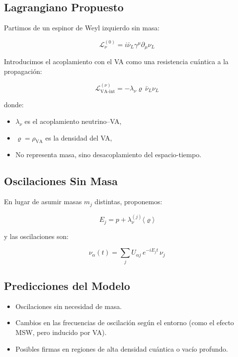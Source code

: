 \documentclass[twoside]{article}
\theoremstyle{definition}
\theoremstyle{remark}
\numberwithin{equation}{section}
\theoremstyle{definition}
\theoremstyle{example}
\theoremstyle{remark}
\numberwithin{equation}{section}%
\begin{document}
		\subsection{Lagrangiano Propuesto}
		
		Partimos de un espinor de Weyl izquierdo sin masa:
		
		\begin{equation}
			\mathcal{L}_{\nu}^{(0)} = i \bar{\nu}_L \gamma^\mu \partial_\mu \nu_L
		\end{equation}
		
		Introducimos el acoplamiento con el VA como una resistencia cuántica a la propagación:
		
		\begin{equation}
			\mathcal{L}_{\text{VA-int}}^{(\nu)} = - \lambda_{\nu} \varrho \, \bar{\nu}_L \nu_L
		\end{equation}
		
		donde:
		\begin{itemize}
			\item \(\lambda_\nu\) es el acoplamiento neutrino–VA,
			\item \(\varrho = \rho_{\text{VA}}\) es la densidad del VA,
			\item No representa masa, sino desacoplamiento del espacio-tiempo.
		\end{itemize}
		
		\subsection{Oscilaciones Sin Masa}
		
		En lugar de asumir masas \(m_j\) distintas, proponemos:
		
		\begin{equation}
			E_j = p + \lambda_\nu^{(j)} \langle \varrho \rangle
		\end{equation}
		
		y las oscilaciones son:
		
		\begin{equation}
			\nu_\alpha(t) = \sum_j U_{\alpha j} \, e^{-i E_j t} \, \nu_j
		\end{equation}
		
		\subsection{Predicciones del Modelo}
		
		\begin{itemize}
			\item Oscilaciones sin necesidad de masa.
			\item Cambios en las frecuencias de oscilación según el entorno (como el efecto MSW, pero inducido por VA).
			\item Posibles firmas en regiones de alta densidad cuántica o vacío profundo.
		\end{itemize}
		
\end{document}
